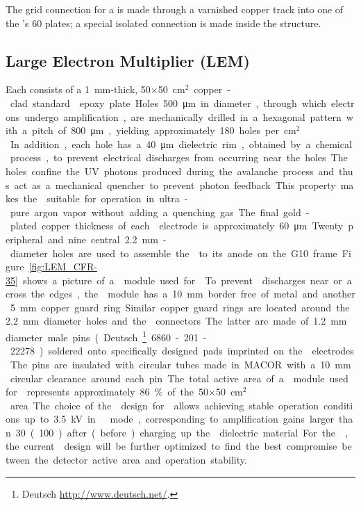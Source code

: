The grid  connection for a  is made through a varnished copper track into one of the 's \num{60}  plates; a special isolated connection  is made inside the  structure.

\subsection{Large Electron Multiplier (LEM)}
\label{sec:fddp-crp-lem}

Each  consists of a \SI{1}{mm}-thick,  \num{50}$\times$\SI{50}{cm$^{2}$} copper-clad standard  epoxy plate. Holes \SI{500}{\micro\meter} in diameter, through which electrons undergo amplification, are mechanically drilled in a hexagonal pattern with a pitch of \SI{800}{\micro\meter}, yielding approximately \num{180} holes per \si{cm$^2$}. In addition, each hole has a  \SI{40}{\micro\meter} dielectric rim, obtained by a chemical process, to prevent electrical discharges from occurring near the holes. The holes confine the UV photons produced during the avalanche process and thus act as a mechanical quencher to prevent photon feedback. This property makes the  suitable for operation in ultra-pure argon vapor without adding a quenching gas. The final gold-plated copper thickness of each  electrode is approximately  \SI{60}{\micro\meter}. Twenty peripheral and nine central \SI{2.2}{mm}-diameter holes are used to assemble the   to its anode on the G10 frame. Figure~\ref{fig:LEM_CFR-35} shows a picture of a  module used for  . To prevent  discharges near or across the edges, the  module has a  \SI{10}{mm} border free of metal and another \SI{5}{mm} copper guard ring. Similar copper guard rings are located around the \SI{2.2}{mm} diameter holes and the  connectors. The latter are made of \SI{1.2}{mm} diameter male pins (Deutsch\footnote{Deutsch\texttrademark{} \url{http://www.deutsch.net/}.} 6860-201-22278.) soldered onto specifically designed pads imprinted on the  electrodes. The pins are insulated with circular tubes made in MACOR with a \SI{10}{mm} circular clearance around each pin. 

The total active area of a  module used for   represents approximately \SI{86}{\%} of the \num{50}$\times$\SI{50}{cm$^{2}$} area. The choice of the  design for  allows achieving stable operation conditions up to \SI{3.5}{kV} in   mode, corresponding to amplification gains larger than \num{30} (\num{100}) after (before) charging up the  dielectric material. For the , the current  design will be further optimized to find the best compromise between the detector active area and operation stability.

